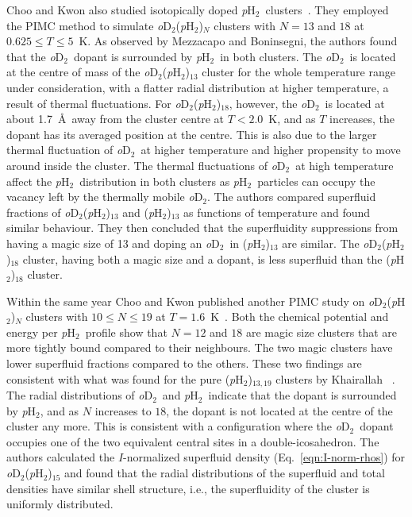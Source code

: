 \documentclass[12pt]{iopart}
\newcommand{\odtwo}{{\em o}D$_2$}
\newcommand{\phtwo}{{\em p}H$_2$}
\begin{document}
Choo and Kwon also studied isotopically doped \phtwo~clusters~\cite{choo_d2h2_clusters}. 
They employed the PIMC method to simulate \odtwo(\phtwo)$_N$ clusters with $N=13$ and $18$ at $0.625 \le T \le 5$~K. 
As observed by Mezzacapo and Boninsegni, the authors found that the \odtwo~dopant is surrounded by \phtwo~in both clusters. 
The \odtwo~is located at the centre of mass of the \odtwo(\phtwo)$_{13}$ cluster for the whole temperature range under consideration, with a flatter radial distribution at higher temperature, a result of  thermal fluctuations. 
For \odtwo(\phtwo)$_{18}$, however, the \odtwo~is located at about 1.7~\AA~away from the cluster centre at $T<2.0$~K, and as $T$ increases, the dopant has its averaged position at the centre. 
This is also due to the larger thermal fluctuation of \odtwo~at higher temperature and higher propensity 
to move around inside the cluster. 
The thermal fluctuations of \odtwo~at high temperature affect the \phtwo~distribution in both clusters as \phtwo~particles can occupy the vacancy left by the thermally mobile \odtwo. 
The authors compared superfluid fractions of \odtwo(\phtwo)$_{13}$ and (\phtwo)$_{13}$ as functions of temperature and found similar behaviour. 
They then concluded that the superfluidity suppressions from having a magic size of 13 and doping an \odtwo~in (\phtwo)$_{13}$ are similar. The \odtwo(\phtwo)$_{18}$ cluster, having both a magic size and a dopant, is less superfluid than the (\phtwo)$_{18}$ cluster.

Within the same year Choo and Kwon published another PIMC study on \odtwo(\phtwo)$_N$ clusters with $10 \le N \le 19$ at $T=1.6$~K~\cite{choo_d2_h2_2}. 
Both the chemical potential and energy per \phtwo~profile show that $N=12$ and $18$ are magic size clusters that are more tightly bound compared to their neighbours. 
The two magic clusters have lower superfluid fractions compared to the others. These two findings are consistent with what was found for the pure (\phtwo)$_{13,19}$ clusters by Khairallah \etal~\cite{magicnumber_pH2}. 
The radial distributions of \odtwo~and \phtwo~indicate that the dopant is surrounded by \phtwo, and as $N$ increases to $18$, the dopant is not located at the centre of the cluster any more. 
This is consistent with a configuration where the \odtwo~dopant occupies one of the two equivalent central sites in a double-icosahedron. 
The authors calculated the $I$-normalized superfluid density (Eq.~\ref{eqn:I-norm-rhos}) for \odtwo(\phtwo)$_{15}$ and found that the radial distributions of the superfluid and total densities have similar shell structure, i.e., the superfluidity of the cluster is uniformly distributed.
\end{document}
